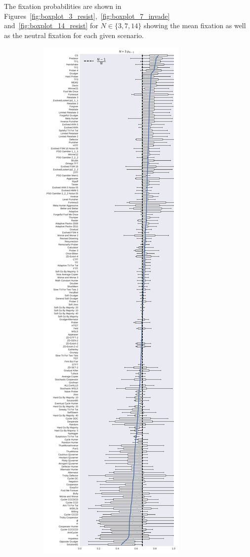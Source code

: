 \documentclass{article}
\begin{document}
The fixation probabilities are shown in
Figures~\ref{fig:boxplot_3_resist},~\ref{fig:boxplot_7_invade}
and~\ref{fig:boxplot_14_resist} for \(N\in\{3, 7, 14\}\) showing the mean
fixation as well as the neutral fixation for each given scenario.


\begin{figure}[!hbtp]
    \centering
    \begin{subfigure}{.3\textwidth}
        \centering
        \includegraphics[height=.9\textheight]{./img/boxplot_3_resist.pdf}

\end{subfigure}
\end{figure}
\end{document}
